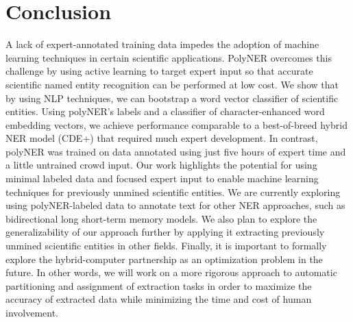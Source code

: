 \section{Conclusion}
\label{sect:apner_conclusion}
A lack of expert-annotated training data impedes the adoption of machine learning techniques in certain scientific applications.
PolyNER overcomes this challenge by 
using active learning to target 
expert input so that accurate scientific named entity recognition can be performed at low cost.
We show that by using NLP techniques, we can bootstrap a word vector classifier of scientific entities.
Using polyNER's labels and a classifier of character-enhanced word embedding vectors, we achieve 
performance comparable to a best-of-breed
hybrid NER model (CDE+) that required much expert development.
In contrast, polyNER was trained on data annotated using just five hours of expert time and a little untrained crowd input.
Our work highlights the potential for using minimal labeled data %
and focused expert input to enable machine learning techniques for previously unmined scientific entities. 
We are currently exploring using polyNER-labeled data to annotate text for other NER approaches,
such as bidirectional long short-term memory models.
We also plan to explore the generalizability of our approach further by applying it extracting previously unmined scientific entities in other fields.
Finally, it is important to formally explore the hybrid-computer partnership as an optimization problem in the future.
In other words, we will work on a more
rigorous approach to automatic partitioning and assignment of extraction tasks in order to maximize the accuracy of extracted data while minimizing the time and cost of human involvement.

